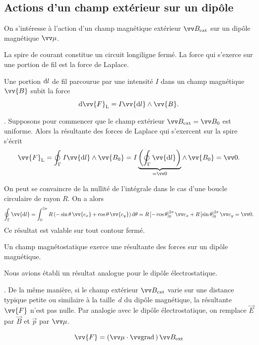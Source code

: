 \documentclass[12pt,fancy]{cours}
\begin{document}
\subsection{Actions d'un champ extérieur sur un dipôle}
On s’intéresse à l’action d’un champ magnétique extérieur $\B_{\rm ext}$ sur un dipôle magnétique $\M$.

\label{subsec:résultante}
La spire de courant constitue un circuit longiligne fermé. La force qui s'exerce sur une portion de fil est la force de Laplace.

\begin{theorem}
  Une portion $\mathrm{d} l$  de fil parcourue par une intensité $I$ dans un champ magnétique $\vv{B}$ subit la force
  \begin{equation*}
\d \vv{F}_{\rm{L}}= I\vv{\d l}\pv \vv{B}.
\end{equation*}
\end{theorem}


.
Supposons pour commencer que le champ extérieur $\B_{\rm ext}=\Vec{B}_0$ est uniforme. 
Alors la résultante des forces de Laplace qui s'exercent sur la spire s'écrit
\begin{equation}
\vv{F}_{\rm{L}}=\oint_{\Gamma}I\vv{\d l}\pv \vv{B_0}=I\underbrace{\left(\oint_{\Gamma}\vv{\d l}\right)}_{=\Vec{0}}\pv\,\vv{B_0}=\Vec{0}.
\end{equation}
\begin{remarque}
  On peut se convaincre de la nullité de l'intégrale dans le cas d'une boucle circulaire de rayon $R$. On a alors 
  $$
\oint_{\Gamma}\vv{\d l}=\int_0^{2\pi}R\left(-\sin\theta\,\vv{e_x}+\cos\theta\,\vv{e_y}\right)\d \theta= R \left[-\cos\theta\right]_0^{2\pi} \ex + R \left[\sin\theta\right]_0^{2\pi} \ey = \Vec{0}.
  $$
  Ce résultat est valable sur tout contour fermé.

\end{remarque}
\begin{prop}\label{prop:}
Un champ magnétostatique  exerce une résultante des forces  sur un dipôle magnétique.
\end{prop}
\noindent
Nous avions établi un résultat analogue pour le dipôle électrostatique.

. De la même manière, si le champ extérieur $\B_{\rm ext}$ varie sur une distance typique petite ou similaire à la taille~$d$ du dipôle magnétique, la résultante $\vv{F}$ n’est pas nulle. Par analogie avec le dipôle électrostatique, on remplace $\Vec{E}$ par $\Vec{B}$ et $\Vec{p}$ par $\M$.
\begin{theorem}
\begin{equation*}
\vv{F}=\left(\M\cdot\grad{}\right)\B_{\rm ext}
\end{equation*}
\end{theorem}
\noindent
\end{document}
